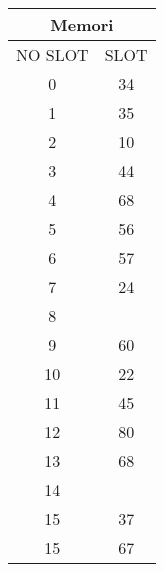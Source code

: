 \documentclass[12pt,a4paper]{article}
\begin{document}
\begin{enumerate}
\begin{multicols}{2}
      \begin{center}
        \begin{adjustbox}{scale=1,center}
          \begin{tabular}{ |c|c| } 
            \hline \multicolumn{2}{|c|}{Memori} \\ \hline \hline 
            NO SLOT & SLOT  \\ \hline
            0       & 34    \\ \hline
            1       & 35    \\ \hline
            2       & 10    \\ \hline
            3       & 44    \\ \hline
            4       & 68    \\ \hline
            5       & 56    \\ \hline
            6       & 57    \\ \hline
            7       & 24    \\ \hline
            8       &       \\ \hline
            9       & 60    \\ \hline
            10      & 22    \\ \hline
            11      & 45    \\ \hline
            12      & 80    \\ \hline
            13      & 68    \\ \hline
            14      &       \\ \hline
            15      & 37    \\ \hline
            15      & 67    \\ \hline

          \end{tabular}
        \end{adjustbox}
      \end{center}


\end{multicols}
\end{enumerate}
\end{document}
